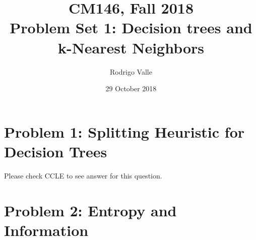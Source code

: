 \documentclass[11pt]{article}
\newcommand{\cnum}{CM146}
\newcommand{\ced}{Fall 2018}
\newcommand{\ctitle}[2]{\title{\vspace{-0.5in}\cnum, \ced\\Problem Set #1: #2}}
\newenvironment{solution}{\color{blue}{\bf Solution:}}{}
\begin{document}
\ctitle{1}{Decision trees and k-Nearest Neighbors}
\author{Rodrigo Valle}
\date{29 October 2018}
\maketitle

\section{Problem 1: Splitting Heuristic for Decision Trees}
\begin{solution}
  Please check CCLE to see answer for this question.
\end{solution}

\newpage
\section{Problem 2: Entropy and Information}
\end{document}
